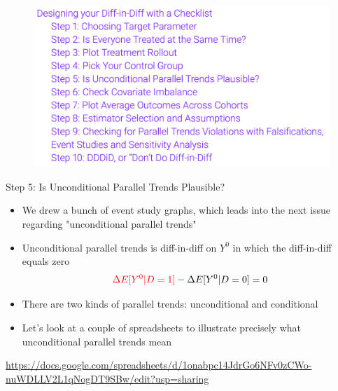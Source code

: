 \documentclass{beamer}
\begin{document}
\begin{frame}
 
\begin{figure}
    \centering
    \includegraphics[width=\textwidth]{./lecture_includes/checklist}
\end{figure}

\end{frame}

\begin{frame}{Step 5: Is Unconditional Parallel Trends Plausible?}

\begin{itemize}
\item We drew a bunch of event study graphs, which leads into the next issue regarding "unconditional parallel trends"
\item Unconditional parallel trends is diff-in-diff on $Y^0$ in which the diff-in-diff equals zero
	$$\textcolor{red}{\Delta E[Y^0|D=1]} - \Delta E[Y^0|D=0] = 0$$ 
\item There are two kinds of parallel trends: unconditional and conditional
\item Let's look at a couple of spreadsheets to illustrate precisely what unconditional parallel trends mean
\end{itemize}

\bigskip 

\url{https://docs.google.com/spreadsheets/d/1onabpc14JdrGo6NFv0zCWo-nuWDLLV2L1qNogDT9SBw/edit?usp=sharing}

\end{frame}
\end{document}
